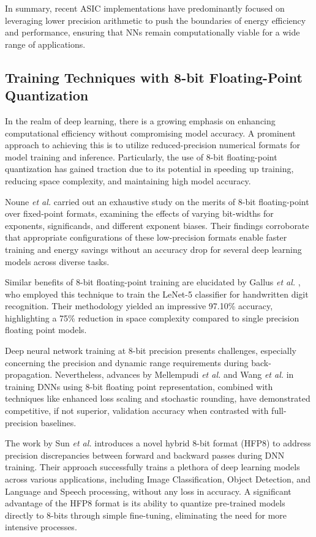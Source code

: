 In summary, recent ASIC implementations have predominantly focused on leveraging lower precision arithmetic to push the boundaries of energy efficiency and performance, ensuring that NNs remain computationally viable for a wide range of applications.

\subsection{Training Techniques with 8-bit Floating-Point Quantization}

In the realm of deep learning, there is a growing emphasis on enhancing computational efficiency without compromising model accuracy. A prominent approach to achieving this is to utilize reduced-precision numerical formats for model training and inference. Particularly, the use of 8-bit floating-point quantization has gained traction due to its potential in speeding up training, reducing space complexity, and maintaining high model accuracy.

Noune \textit{et al.} \cite{noune20228} carried out an exhaustive study on the merits of 8-bit floating-point over fixed-point formats, examining the effects of varying bit-widths for exponents, significands, and different exponent biases. Their findings corroborate that appropriate configurations of these low-precision formats enable faster training and energy savings without an accuracy drop for several deep learning models across diverse tasks.

Similar benefits of 8-bit floating-point training are elucidated by Gallus \textit{et al.} \cite{gallus2018handwritten}, who employed this technique to train the LeNet-5 classifier for handwritten digit recognition. Their methodology yielded an impressive 97.10\% accuracy, highlighting a 75\% reduction in space complexity compared to single precision floating point models.

Deep neural network training at 8-bit precision presents challenges, especially concerning the precision and dynamic range requirements during back-propagation. Nevertheless, advances by Mellempudi \textit{et al.} \cite{mellempudi2019mixed} and Wang \textit{et al.} \cite{wang2018training} in training DNNs using 8-bit floating point representation, combined with techniques like enhanced loss scaling and stochastic rounding, have demonstrated competitive, if not superior, validation accuracy when contrasted with full-precision baselines.

The work by Sun \textit{et al.} \cite{sun2019hybrid} introduces a novel hybrid 8-bit format (HFP8) to address precision discrepancies between forward and backward passes during DNN training. Their approach successfully trains a plethora of deep learning models across various applications, including Image Classification, Object Detection, and Language and Speech processing, without any loss in accuracy. A significant advantage of the HFP8 format is its ability to quantize pre-trained models directly to 8-bits through simple fine-tuning, eliminating the need for more intensive processes.

